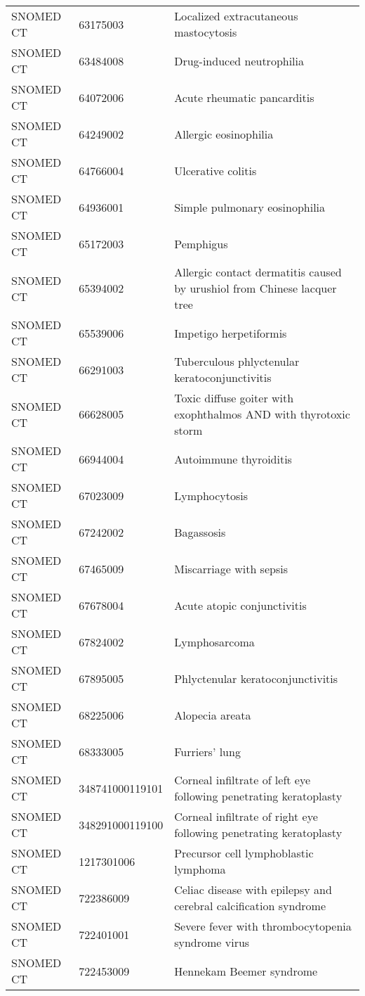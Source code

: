 \begin{longtable}{p{}p{}p{}}
  SNOMED CT & 63175003 & Localized extracutaneous mastocytosis \\ 
  SNOMED CT & 63484008 & Drug-induced neutrophilia \\ 
  SNOMED CT & 64072006 & Acute rheumatic pancarditis \\ 
  SNOMED CT & 64249002 & Allergic eosinophilia \\ 
  SNOMED CT & 64766004 & Ulcerative colitis \\ 
  SNOMED CT & 64936001 & Simple pulmonary eosinophilia \\ 
  SNOMED CT & 65172003 & Pemphigus \\ 
  SNOMED CT & 65394002 & Allergic contact dermatitis caused by urushiol from Chinese lacquer tree \\ 
  SNOMED CT & 65539006 & Impetigo herpetiformis \\ 
  SNOMED CT & 66291003 & Tuberculous phlyctenular keratoconjunctivitis \\ 
  SNOMED CT & 66628005 & Toxic diffuse goiter with exophthalmos AND with thyrotoxic storm \\ 
  SNOMED CT & 66944004 & Autoimmune thyroiditis \\ 
  SNOMED CT & 67023009 & Lymphocytosis \\ 
  SNOMED CT & 67242002 & Bagassosis \\ 
  SNOMED CT & 67465009 & Miscarriage with sepsis \\ 
  SNOMED CT & 67678004 & Acute atopic conjunctivitis \\ 
  SNOMED CT & 67824002 & Lymphosarcoma \\ 
  SNOMED CT & 67895005 & Phlyctenular keratoconjunctivitis \\ 
  SNOMED CT & 68225006 & Alopecia areata \\ 
  SNOMED CT & 68333005 & Furriers' lung \\ 
  SNOMED CT & 348741000119101 & Corneal infiltrate of left eye following penetrating keratoplasty \\ 
  SNOMED CT & 348291000119100 & Corneal infiltrate of right eye following penetrating keratoplasty \\ 
  SNOMED CT & 1217301006 & Precursor cell lymphoblastic lymphoma \\ 
  SNOMED CT & 722386009 & Celiac disease with epilepsy and cerebral calcification syndrome \\ 
  SNOMED CT & 722401001 & Severe fever with thrombocytopenia syndrome virus \\ 
  SNOMED CT & 722453009 & Hennekam Beemer syndrome \\ 

\end{longtable}
